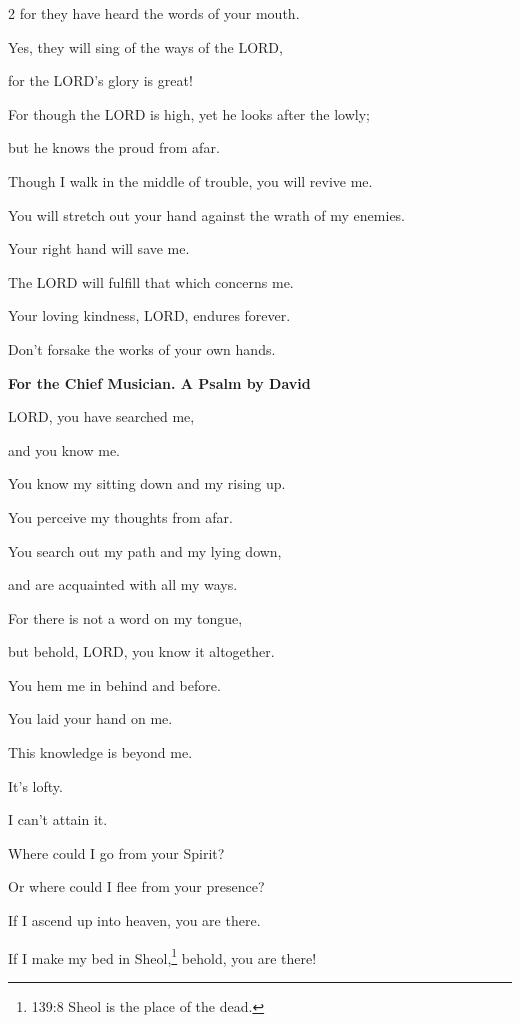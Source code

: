 \begin{multicols}{2}
	for they have heard the words of your mouth.
	
	
	\myverse{}Yes, they will sing of the ways of the LORD,
	
	for the LORD’s glory is great!
	
	
	\myverse{}For though the LORD is high, yet he looks after the lowly;
	
	but he knows the proud from afar.
	
	
	\myverse{}Though I walk in the middle of trouble, you will revive me.
	
	You will stretch out your hand against the wrath of my enemies.
	
	Your right hand will save me.
	
	
	\myverse{}The LORD will fulfill that which concerns me.
	
	Your loving kindness, LORD, endures forever.
	
	Don’t forsake the works of your own hands.
	
	
	\mychapter{}\textbf{For the Chief Musician. A Psalm by David}
	
	\quad\quad\quad\myverse*{}LORD, you have searched me,
	
	and you know me.
	
	
	\myverse{}You know my sitting down and my rising up.
	
	You perceive my thoughts from afar.
	
	
	\myverse{}You search out my path and my lying down,
	
	and are acquainted with all my ways.
	
	
	\myverse{}For there is not a word on my tongue,
	
	but behold, LORD, you know it altogether.
	
	
	\myverse{}You hem me in behind and before.
	
	You laid your hand on me.
	
	
	\myverse{}This knowledge is beyond me.
	
	It’s lofty.
	
	I can’t attain it.
	
	
	\myverse{}Where could I go from your Spirit?
	
	Or where could I flee from your presence?
	
	
	\myverse{}If I ascend up into heaven, you are there.
	
	If I make my bed in Sheol,\footnote{139:8 Sheol is the place of the dead.} behold, you are there!
	

\end{multicols}
